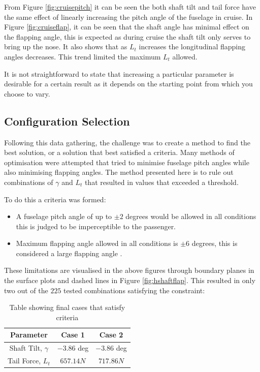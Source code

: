 \documentclass[11pt,a4paper]{article}
\begin{document}
From Figure \ref{fig:cruisepitch} it can be seen the both shaft tilt and tail force have the same effect of linearly increasing the pitch angle of the fuselage in cruise. In Figure \ref{fig:cruiseflap}, it can be seen that the shaft angle has minimal effect on the flapping angle, this is expected as during cruise the shaft tilt only serves to bring up the nose. It also shows that as $L_t$ increases the longitudinal flapping angles decreases. This trend limited the maximum $L_t$ allowed.

It is not straightforward to state that increasing a particular parameter is desirable for a certain result as it depends on the starting point from which you choose to vary.


\subsection{Configuration Selection}


Following this data gathering, the challenge was to create a method to find the best solution, or a solution that best satisfied a criteria. Many methods of optimisation were attempted that tried to minimise fuselage pitch angles while also minimising flapping angles. The method presented here is to rule out combinations of $\gamma$ and $L_t$ that resulted in values that exceeded a threshold.

To do this a criteria was formed:

\begin{itemize}
    \item A fuselage pitch angle of up to $\pm2$ degrees would be allowed in all conditions this is judged to be imperceptible to the passenger.
    \item Maximum flapping angle allowed in all conditions is $\pm6$ degrees, this is considered a large flapping angle \cite{prouty}\cite{padfield}.
\end{itemize}{}

These limitations are visualised in the above figures through boundary planes in the surface plots and dashed lines in Figure \ref{fig:hshaftflap}.
This resulted in only two out of the $225$ tested combinations satisfying the constraint:

\begin{table}[H]
\centering 
    \caption{Table showing final cases that satisfy criteria}
\begin{tabular}{ccc}
\hline
  \rowcolor[HTML]{DAE8FC} 
  Parameter & Case 1 & Case 2\\ \hline
   Shaft Tilt, $\gamma$ & $-3.86$ deg & $-3.86$ deg\\
   Tail Force, $L_t$ & $657.14N$ & $717.86N$\\
   \hline
\end{tabular}{}
    \label{tab:long}
\end{table}{}
\end{document}
